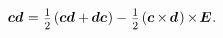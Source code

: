 \begin{otherlanguage}{russian}
\nopagebreak\vspace{-0.6em}\begin{equation}\label{symmetricantisymmetricdecompositionofdyad}
\hspace*{1em} \bm{c}\bm{d} \hspace{.1ex} = \hspace{.1ex}
\smalldisplaystyleonehalf \hspace{-0.1ex} \left( \bm{c}\bm{d} + \hspace{-0.1ex} \bm{d}\bm{c} \hspace{0.1ex} \right)
- \hspace{.16ex} \smalldisplaystyleonehalf \hspace{-0.1ex} \left( \bm{c} \hspace{-0.1ex} \times \hspace{-0.2ex} \bm{d} \hspace{.2ex} \right) \hspace{-0.12ex} \times \hspace{-0.25ex} \bm{E} \hspace{.1ex} .
\end{equation}

\end{otherlanguage}



\label{para:eigenvectorseigenvalues}

